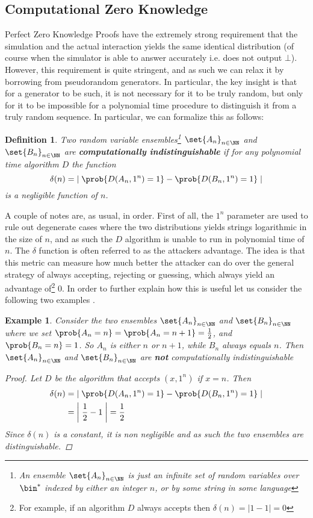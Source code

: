 \documentclass{article}
\newtheorem{definition}{Definition}
\newtheorem{example}{Example}
\begin{document}
\subsection{Computational Zero Knowledge}
Perfect Zero Knowledge Proofs have the extremely strong requirement that the simulation and the actual interaction yields the same identical distribution (of course when the simulator is able to answer accurately i.e. does not output $\bot$). However, this requirement is quite stringent, and as such we can relax it by borrowing from pseudorandom generators. In particular, the key insight is that for a generator to be such, it is not necessary for it to be truly random, but only for it to be impossible for a polynomial time procedure to distinguish it from a truly random sequence. In particular, we can formalize this as follows:
\begin{definition}
    Two random variable ensembles\footnote{An ensemble $\set{A_n}_{n \in \NN}$ is just an infinite set of random variables over $\bin^*$ indexed by either an integer $n$, or by some string in some language} $\set{A_n}_{n \in \NN}$ and $\set{B_n}_{n \in \NN}$ are \textbf{computationally indistinguishable} if for any polynomial time algorithm $D$ the function
    \[ \delta(n) = \left| \; \prob{D(A_n, 1^n) = 1} - \prob{D(B_n, 1^n) = 1} \;  \right|  \] is a negligible function of $n$.
\end{definition}
A couple of notes are, as usual, in order. First of all, the $1^n$ parameter are used to rule out degenerate cases where the two distributions yields strings logarithmic in the size of $n$, and as such the $D$ algorithm is unable to run in polynomial time of $n$. The $\delta$ function is often referred to as the attackers advantage. The idea is that this metric can measure how much better the attacker can do over the general strategy of always accepting, rejecting or guessing, which always yield an advantage of\footnote{For example, if an algorithm $D$ always accepts then $\delta(n) = |1 - 1| = 0$} 0.
In order to further explain how this is useful let us consider the following two examples \cite{ProvableSecurityComputational}.

\begin{example}
    Consider the two ensembles $\set{A_n}_{n \in \NN}$ and $\set{B_n}_{n \in \NN}$ where we set $\prob{A_n = n} = \prob{A_n = n+1} = \frac{1}{2}$, and $\prob{B_n = n} = 1$. So $A_n$ is either $n$ or $n+1$, while $B_n$ always equals $n$. Then $\set{A_n}_{n \in \NN}$ and $\set{B_n}_{n \in \NN}$ are \textbf{not} computationally indistinguishable
    \begin{proof}
        Let $D$ be the algorithm that accepts $(x, 1^n)$ if $x = n$. Then
        \begin{align*}
            \delta(n) & = \left| \; \prob{D(A_n, 1^n) = 1} - \prob{D(B_n, 1^n) = 1} \;  \right| \\
                      & = \left| \; \frac{1}{2} - 1 \;  \right| = \frac{1}{2}
        \end{align*}
        Since $\delta(n)$ is a constant, it is non negligible and as such the two ensembles are distinguishable.
    \end{proof}
\end{example}
\end{document}
